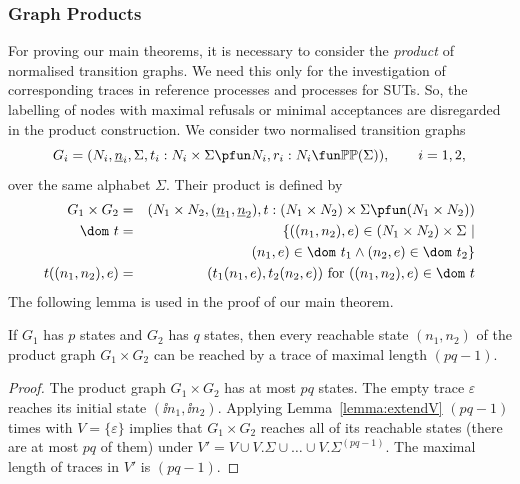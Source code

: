 \subsubsection*{Graph Products}
\label{sec:GP}

For proving our main theorems, it is necessary to consider the \emph{product}
of normalised transition graphs. We need this only for the investigation of
corresponding traces in reference processes and processes for SUTs. So, the
labelling of nodes with maximal refusals or minimal acceptances are
disregarded in the product construction. We consider two normalised
transition graphs
\[
G_i = ( N_i, \ii n_i, \Sigma, t_i : N_i\times\Sigma \pfun N_i, r_i : N_i \fun \mathbb{P}\mathbb{P}(\Sigma)),\qquad i = 1,2,
\]
over the same alphabet $\Sigma$. Their product is defined by
%
\begin{eqnarray}
G_1\times G_2 & = & (N_1\times N_2,(\ii n_1,\ii n_2), t:(N_1\times N_2)\times\Sigma\pfun (N_1\times N_2))
\\
\dom~t & = & \{ ((n_1,n_2),e)\in (N_1\times N_2)\times\Sigma~|   \nonumber
\\ & & \tabc
(n_1,e)\in\dom~t_1\wedge
(n_2,e) \in\dom~t_2    \}
\\
t((n_1,n_2),e) & = & (t_1(n_1,e),t_2(n_2,e))\ \text{for $((n_1,n_2),e)\in\dom~t$}
\end{eqnarray}
%
The following lemma is used in the proof of our main theorem.
%
\begin{lemma}\label{lemma:reachproduc}
If $G_1$ has $p$ states and $G_2$ has $q$ states, then every reachable state
$(n_1,n_2)$ of the product graph $G_1\times G_2$ can be reached by a trace
of maximal length $(pq-1)$.
\end{lemma}
\begin{proof}
The product graph $G_1\times G_2$ has at most $pq$ states. The empty trace $\varepsilon$
reaches its initial state $(\ii n_1,\ii n_2)$. Applying Lemma~\ref{lemma:extendV}
$(pq-1)$ times with $V=\{\varepsilon \}$ implies that $G_1\times G_2$ reaches
all of its reachable states (there are at most $pq$ of them) under
$V' = V \cup V.\Sigma\cup\dots \cup V.\Sigma^{(pq-1)}$. The maximal length of traces in
$V'$ is $(pq-1)$.
\xbox
\end{proof}

